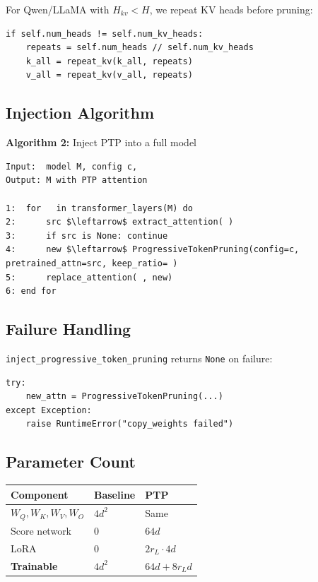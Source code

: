 For Qwen/LLaMA with $H_{kv} < H$, we repeat KV heads before pruning:

\begin{lstlisting}
if self.num_heads != self.num_kv_heads:
    repeats = self.num_heads // self.num_kv_heads
    k_all = repeat_kv(k_all, repeats)
    v_all = repeat_kv(v_all, repeats)
\end{lstlisting}

\subsection{Injection Algorithm}

\textbf{Algorithm 2:} Inject PTP into a full model
\begin{lstlisting}
Input:  model M, config c,  
Output: M with PTP attention

1:  for   in transformer_layers(M) do
2:      src $\leftarrow$ extract_attention( )
3:      if src is None: continue
4:      new $\leftarrow$ ProgressiveTokenPruning(config=c, pretrained_attn=src, keep_ratio= )
5:      replace_attention( , new)
6: end for
\end{lstlisting}

\subsection{Failure Handling}

\texttt{inject\_progressive\_token\_pruning} returns \texttt{None} on failure:

\begin{lstlisting}
try:
    new_attn = ProgressiveTokenPruning(...)
except Exception:
    raise RuntimeError("copy_weights failed")
\end{lstlisting}

\subsection{Parameter Count}

\begin{table}[H]
\centering
\small
\begin{tabular}{lll}
\toprule
\textbf{Component} & \textbf{Baseline} & \textbf{PTP} \\
\midrule
$W_Q, W_K, W_V, W_O$ & $4 d^2$ & Same \\
Score network & 0 & $64 d$ \\
LoRA & 0 & $2 r_L \cdot 4 d$ \\
\textbf{Trainable} & $4 d^2$ & \textbf{$64 d + 8 r_L d$} \\
\bottomrule
\end{tabular}
\end{table}

